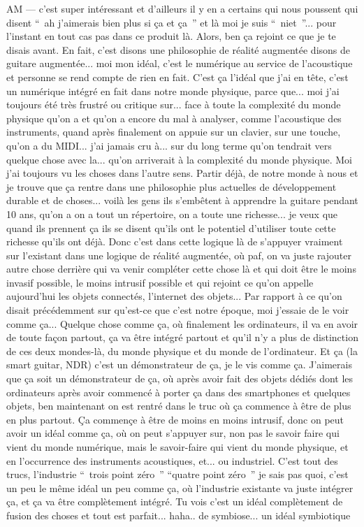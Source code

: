 AM — c'est super intéressant et d'ailleurs il y en a certains qui nous poussent qui disent “ ah j'aimerais bien plus si ça et ça ” et là moi je suis “ niet ”... pour l'instant en tout cas pas dans ce produit là. Alors, ben ça rejoint ce que je te disais avant. En fait, c'est disons une philosophie de réalité augmentée disons de guitare augmentée... moi mon idéal, c'est le numérique au service de l'acoustique et personne se rend compte de rien en fait. C'est ça l'idéal que j'ai en tête, c'est un numérique intégré en fait dans notre monde physique, parce que... moi j'ai toujours été très frustré ou critique sur... face à toute la complexité du monde physique qu'on a et qu'on a encore du mal à analyser, comme l'acoustique des instruments, quand après finalement on appuie sur un clavier, sur une touche, qu'on a du MIDI... j'ai jamais cru à... sur du long terme qu'on tendrait vers quelque chose avec la... qu'on arriverait à la complexité du monde physique. Moi j'ai toujours vu les choses dans l'autre sens. Partir déjà, de notre monde à nous et je trouve que ça rentre dans une philosophie plus actuelles de développement durable et de choses... voilà les gens ils s'embêtent à apprendre la guitare pendant 10 ans, qu'on a on a tout un répertoire, on a toute une richesse... je veux que quand ils prennent ça ils se disent qu'ils ont le potentiel d'utiliser toute cette richesse qu'ils ont déjà. Donc c'est dans cette logique là de s'appuyer vraiment sur l'existant dans une logique de réalité augmentée, où paf, on va juste rajouter autre chose derrière qui va venir compléter cette chose là et qui doit être le moins invasif possible, le moins intrusif possible et qui rejoint ce qu'on appelle aujourd'hui les objets connectés, l'internet des objets... Par rapport à ce qu'on disait précédemment sur qu'est-ce que c'est notre époque, moi j'essaie de le voir comme ça... Quelque chose comme ça, où finalement les ordinateurs, il va en avoir de toute façon partout, ça va être intégré partout et qu'il n'y a plus de distinction de ces deux mondes-là, du monde physique et du monde de l'ordinateur. Et ça (la smart guitar, NDR) c'est un démonstrateur de ça, je le vis comme ça. J'aimerais que ça soit un démonstrateur de ça, où après avoir fait des objets dédiés dont les ordinateurs après avoir commencé à porter ça dans des smartphones et quelques objets, ben maintenant on est rentré dans le truc où ça commence à être de plus en plus partout. Ça commençe à être de moins en moins intrusif, donc on peut avoir un idéal comme ça, où on peut s'appuyer sur, non pas le savoir faire qui vient du monde numérique, mais le savoir-faire qui vient du monde physique, et en l'occurrence des instruments acoustiques, et... ou industriel. C'est tout des trucs, l'industrie “ trois point zéro ”  “quatre point zéro ” je sais pas quoi, c'est un peu le même idéal un peu comme ça, où l'industrie existante va juste intégrer ça, et ça va être complètement intégré. Tu vois c'est un idéal complètement de fusion des choses et tout est parfait... haha.. de symbiose... un idéal symbiotique 

